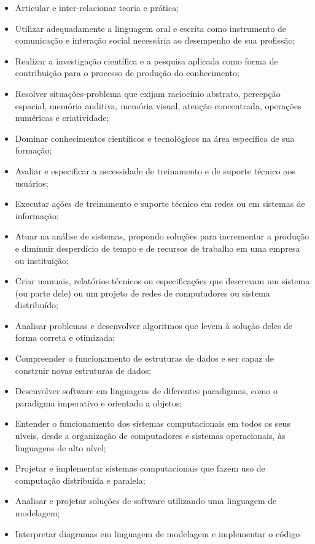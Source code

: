 \begin{itemize}
	\item Articular e inter-relacionar teoria e prática;
	\item Utilizar adequadamente a linguagem oral e escrita como instrumento de comunicação e interação social necessária ao desempenho de sua profissão;
	\item Realizar a investigação científica e a pesquisa aplicada como forma de contribuição para o
processo de produção do conhecimento;
	\item Resolver situações-problema que exijam raciocínio abstrato, percepção espacial, memória
auditiva, memória visual, atenção concentrada, operações numéricas e criatividade;
	\item Dominar conhecimentos científicos e tecnológicos na área específica de sua formação;
	\item Avaliar e especificar a necessidade de treinamento e de suporte técnico aos usuários;
	\item Executar ações de treinamento e suporte técnico em redes ou em sistemas de informação;
	\item Atuar na análise de sistemas, propondo soluções para incrementar a produção e diminuir
desperdício de tempo e de recursos de trabalho em uma empresa ou instituição;
	\item Criar manuais, relatórios técnicos ou especificações que descrevam um sistema (ou parte
dele) ou um projeto de redes de computadores ou sistema distribuído;
	\item Analisar problemas e desenvolver algoritmos que levem à solução deles de forma correta e otimizada;
	\item Compreender o funcionamento de estruturas de dados e ser capaz de construir
novas estruturas de dados;
	\item Desenvolver software em linguagens de diferentes paradigmas, como o paradigma imperativo e orientado a objetos;
	\item Entender o funcionamento dos sistemas computacionais em todos os seus níveis, desde a organização de computadores e sistemas operacionais, às linguagens de alto nível;
	\item Projetar e implementar sistemas computacionais que fazem uso de computação distribuída e paralela;
	\item Analisar e projetar soluções de software utilizando uma linguagem de modelagem;
	\item Interpretar diagramas em linguagem de modelagem e implementar o código

\end{itemize}
